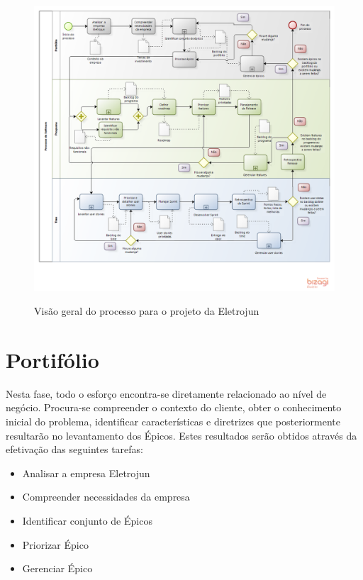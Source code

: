 \FloatBarrier
\begin{figure}[!htpd]
		\centering
		\includegraphics[scale=0.55]{figuras/Eletrojun}
		\label{img:processoeletrojun}
		\caption{Visão geral do processo para o projeto da Eletrojun}
\end{figure}
\FloatBarrier

\section {Portifólio}

Nesta fase, todo o esforço encontra-se diretamente relacionado ao nível de negócio. Procura-se compreender o contexto do cliente, obter o conhecimento inicial do problema, identificar características e diretrizes que posteriormente  resultarão no levantamento dos Épicos.  Estes resultados serão obtidos através da efetivação das seguintes tarefas:

\begin{itemize}
\item Analisar a empresa Eletrojun
\item Compreender necessidades da empresa
\item Identificar conjunto de Épicos
\item Priorizar Épico
\item Gerenciar Épico
\end{itemize}

